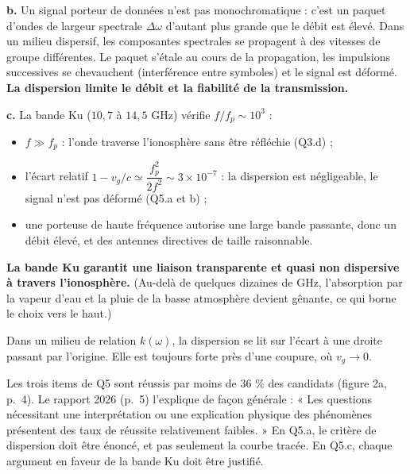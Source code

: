\documentclass[11pt,a4paper]{article}
\providecommand{\tightlist}{\setlength{\itemsep}{0pt}\setlength{\parskip}{0pt}}
\begin{document}
\textbf{b.} Un signal porteur de données n'est pas monochromatique : c'est un paquet d'ondes de largeur spectrale \(\Delta\omega\) d'autant plus grande que le débit est élevé. Dans un milieu dispersif, les composantes spectrales se propagent à des vitesses de groupe différentes. Le paquet s'étale au cours de la propagation, les impulsions successives se chevauchent (interférence entre symboles) et le signal est déformé. \textbf{La dispersion limite le débit et la fiabilité de la transmission.}

\textbf{c.} La bande Ku (\(10{,}7\) à \(14{,}5\) GHz) vérifie \(f/f_p\sim10^3\) :

\begin{itemize}
\tightlist
\item
  \(f\gg f_p\) : l'onde traverse l'ionosphère sans être réfléchie (Q3.d) ;
\item
  l'écart relatif \(1-v_g/c\simeq\dfrac{f_p^2}{2f^2}\sim3\times10^{-7}\) : la dispersion est négligeable, le signal n'est pas déformé (Q5.a et b) ;
\item
  une porteuse de haute fréquence autorise une large bande passante, donc un débit élevé, et des antennes directives de taille raisonnable.
\end{itemize}

\textbf{La bande Ku garantit une liaison transparente et quasi non dispersive à travers l'ionosphère.} (Au-delà de quelques dizaines de GHz, l'absorption par la vapeur d'eau et la pluie de la basse atmosphère devient gênante, ce qui borne le choix vers le haut.)

\begin{methode}

Dans un milieu de relation \(k(\omega)\), la dispersion se lit sur l'écart à une droite passant par l'origine. Elle est toujours forte près d'une coupure, où \(v_g\to0\).

\end{methode}

\begin{jury}

Les trois items de Q5 sont réussis par moins de 36 \% des candidats (figure 2a, p.~4). Le rapport 2026 (p.~5) l'explique de façon générale : « Les questions nécessitant une interprétation ou une explication physique des phénomènes présentent des taux de réussite relativement faibles. » En Q5.a, le critère de dispersion doit être énoncé, et pas seulement la courbe tracée. En Q5.c, chaque argument en faveur de la bande Ku doit être justifié.

\end{jury}
\end{document}
